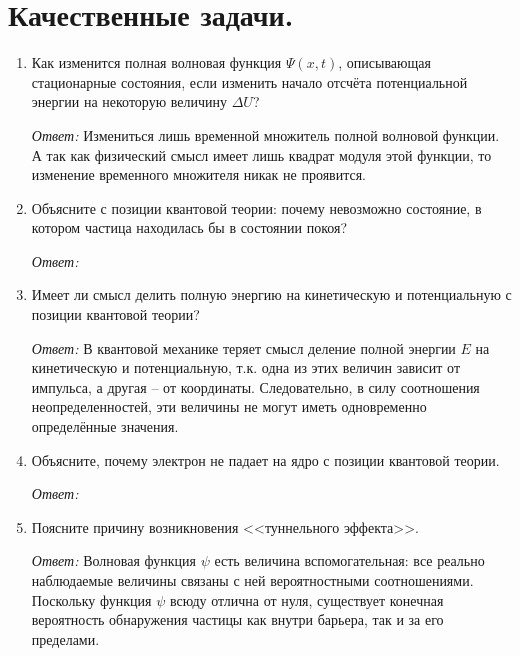 \section{Качественные задачи.}

\begin{enumerate}

\item Как изменится полная волновая функция \( \Psi(x,t) \), описывающая
стационарные состояния, если изменить начало отсчёта потенциальной энергии на
некоторую величину \( \Delta U \)?

\emph{Ответ:}
Измениться лишь временной множитель полной волновой функции. А так как
физический смысл имеет лишь квадрат модуля этой функции, то изменение временного
множителя никак не проявится.

\vspace*{1.5em}
\item Объясните с позиции квантовой теории: почему невозможно состояние, в
котором частица находилась бы в состоянии покоя?

\emph{Ответ:}

\vspace*{1.5em}
\item Имеет ли смысл делить полную энергию на кинетическую и потенциальную с
позиции квантовой теории?

\emph{Ответ:}
В квантовой механике теряет смысл деление полной энергии \( E \) на кинетическую
и потенциальную, т.к. одна из этих величин зависит от импульса, а другая -- от
координаты. Следовательно, в силу соотношения неопределенностей, эти величины не
могут иметь одновременно определённые значения.

\vspace*{1.5em}
\item Объясните, почему электрон не падает на ядро с позиции квантовой теории.

\emph{Ответ:}

\vspace*{1.5em}
\item Поясните причину возникновения <<туннельного эффекта>>.

\emph{Ответ:}
Волновая функция \( \psi \) есть величина вспомогательная: все реально
наблюдаемые величины связаны с ней вероятностными соотношениями. Поскольку
функция \( \psi \) всюду отлична от нуля, существует конечная вероятность
обнаружения частицы как внутри барьера, так и за его пределами.


\end{enumerate}
